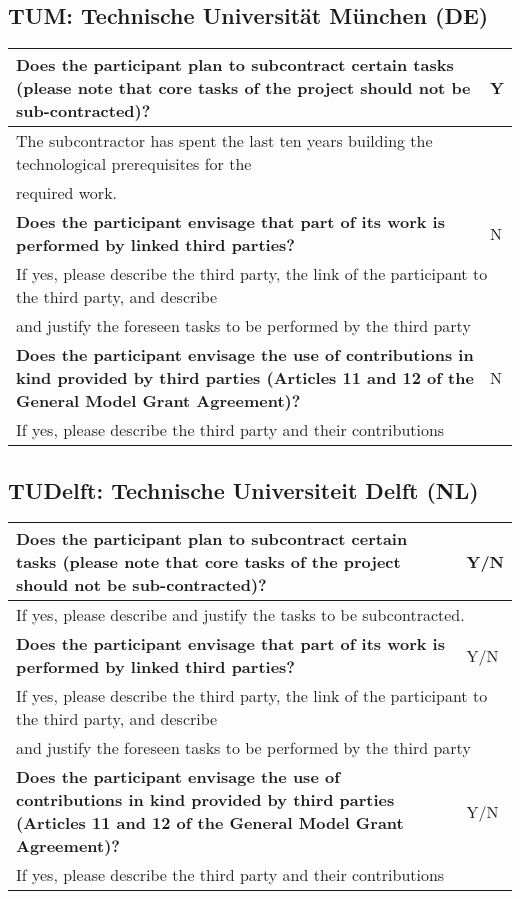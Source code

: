 \subsection{TUM: Technische Universität München (DE)}

\begin{longtable}{|p{}|p{}|}
\hline
{\bf Does the participant plan to subcontract certain tasks (please
  note that core tasks of the project should not be sub-contracted)?}
&
Y
\\
\hline
\multicolumn{2}{|l|}{The subcontractor has spent the last ten years building the technological
  prerequisites for the}\\
\multicolumn{2}{|l|}{required work. }
\\
\hline
{\bf Does the participant envisage that  part of its work is performed
  by linked third parties?}
&
N
\\
\hline
\multicolumn{2}{|l|}{If yes, please describe the third party, the link of the
  participant to the third party, and describe}\\
\multicolumn{2}{|l|}{and justify the foreseen
tasks to be performed by the third party}
\\
\hline
{\bf Does the participant envisage the use of contributions in kind
provided by third parties (Articles 11 and 12 of the General Model
Grant Agreement)?}
&
N
\\
\hline
\multicolumn{2}{|l|}{If yes, please describe the third party and their contributions}
\\
\hline
\end{longtable}


\subsection{TUDelft: Technische Universiteit Delft (NL)}

\begin{longtable}{|p{}|p{}|}
\hline
{\bf Does the participant plan to subcontract certain tasks (please
  note that core tasks of the project should not be sub-contracted)?}
&
Y/N
\\
\hline
\multicolumn{2}{|l|}{
If yes, please describe and justify the tasks to be subcontracted.}
\\
\hline
{\bf Does the participant envisage that  part of its work is performed
  by linked third parties?}
&
Y/N
\\
\hline
\multicolumn{2}{|l|}{If yes, please describe the third party, the link of the
  participant to the third party, and describe}\\
\multicolumn{2}{|l|}{and justify the foreseen
tasks to be performed by the third party}
\\
\hline
{\bf Does the participant envisage the use of contributions in kind
provided by third parties (Articles 11 and 12 of the General Model
Grant Agreement)?}
&
Y/N
\\
\hline
\multicolumn{2}{|l|}{If yes, please describe the third party and their contributions}
\\
\hline
\end{longtable}


